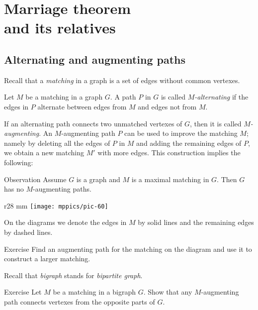 \chapter[Marriage theorem and its relatives]{Marriage theorem\\ and its relatives}

\section*{Alternating and augmenting paths}

Recall that a \emph{matching} in a graph is a set of edges without common vertexes. 

Let $M$ be a matching in a graph $G$.
A path $P$ in $G$ is called \emph{$M$-alternating} if the edges in $P$ 
alternate between edges from $M$ and edges not from $M$.

If an alternating path connects two unmatched vertexes of $G$, then it is called \emph{$M$-augmenting}.
An $M$-augmenting path $P$ can be used to improve the matching $M$;
namely by deleting all the edges of $P$ in $M$
and adding the remaining edges of $P$, we obtain a new matching $M'$ with more edges.
This construction implies the following:

\begin{thm}{Observation}\label{obs:augmenting}
Assume $G$ is a graph and $M$ is a maximal matching in $G$.
Then $G$ has no $M$-augmenting paths.
\end{thm} 

\begin{wrapfigure}[5]{r}{28 mm}
\vskip-4mm
\centering
\texttt{[image: mppics/pic-60]}
\vskip-0mm
\end{wrapfigure}

On the diagrams we denote the edges in $M$ by solid lines and the remaining edges by dashed lines.

\begin{thm}{Exercise}
Find an  augmenting path for the matching on the diagram
and use it to construct a larger matching.
\end{thm}

Recall that \emph{bigraph} stands for \emph{bipartite graph}.

\begin{thm}{Exercise}
Let  $M$ be a matching in a bigraph $G$.
Show that any $M$-augmenting path connects vertexes from the opposite parts of $G$.
\end{thm}

